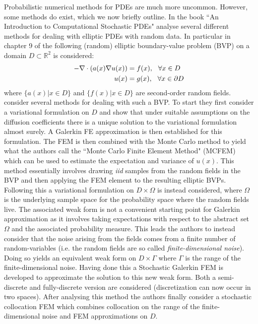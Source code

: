 Probabilistic numerical methods for PDEs are much more uncommon. However, some methods do exist, which we now briefly outline. In the book ``An Introduction to Computational Stochastic PDEs" \textcolor{blue}{\citeauthor{lord2014introduction}} analyse several different methods for dealing with elliptic PDEs with random data. In particular in chapter 9 of \textcolor{blue}{\cite{lord2014introduction}} the following (random) elliptic boundary-value problem (BVP) on a domain $D\subset\mathbb{R}^2$ is considered:
\begin{align*}
-\nabla \cdot(a(x) \nabla u(x)) &=f(x), \hspace{0.25cm} \forall x \in D \\
u(x) &=g(x), \hspace{0.25cm} \forall x \in \partial D
\end{align*}
where $\{a(x)|x\in D\}$ and $\{f(x)|x\in D\}$ are second-order random fields. \textcolor{blue}{\citeauthor{lord2014introduction}} consider several methods for dealing with such a BVP. To start they first consider a variational formulation on $D$ and show that under suitable assumptions on the diffusion coefficients there is a unique solution to the variational formulation almost surely. A Galerkin FE approximation is then established for this formulation.
The FEM is then combined with the Monte Carlo method to yield what the authors call the ``Monte Carlo Finite Element Method" (MCFEM) which can be used to estimate the expectation and variance of $u(x)$. This method essentially involves drawing \textit{iid} samples from the random fields in the BVP and then applying the FEM element to the resulting elliptic BVPs. Following this a variational formulation on $D\times\Omega$ is instead considered, where $\Omega$ is the underlying sample space for the probability space where the random fields live. The associated weak form is not a convenient starting point for Galerkin approximation as it involves taking expectations with respect to the abstract set $\Omega$ and the associated probability measure.
This leads the authors to instead consider that the noise arising from the fields comes from a finite number of random-variables (i.e. the random fields are so called \textit{finite-dimensional noise}). Doing so yields an equivalent weak form on $D\times\Gamma$ where $\Gamma$ is the range of the finite-dimensional noise. Having done this a Stochastic Galerkin FEM is developed to approximate the solution to this new weak form. Both a semi-discrete and fully-discrete version are considered (discretization can now occur in two spaces). After analysing this method the authors finally consider a stochastic collocation FEM which combines collocation on the range of the finite-dimensional noise and FEM approximations on $D$. 



\clearpage
